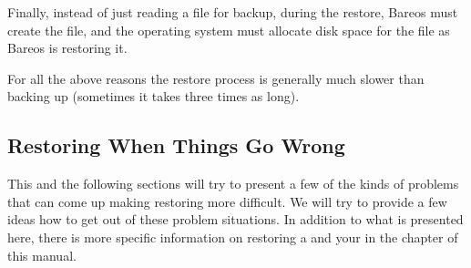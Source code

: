 Finally, instead of just reading a file for backup, during the restore, Bareos
must create the file, and the operating system must allocate disk space for
the file as Bareos is restoring it.

For all the above reasons the restore process is generally much slower than
backing up (sometimes it takes three times as long).


\subsection{Restoring When Things Go Wrong}
\label{database_restore}


This and the following sections will try to present a few of the kinds of
problems that can come up making restoring more difficult. We will try to
provide a few ideas how to get out of these problem situations.
In addition to what is presented here, there is more specific information
on restoring a  and your
 in the  chapter of this manual.

